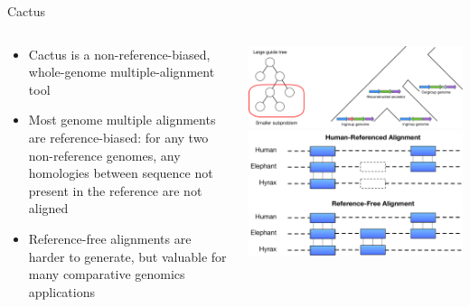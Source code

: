 \documentclass[10pt,
               hyperref={bookmarks=false,
                         bookmarksopen=false,
                         colorlinks=true,
                         linkcolor=blue,
                         urlcolor=blue},
               xcolor={svgnames,table}]{beamer}
\begin{document}
\begin{frame}{Cactus}
  \begin{columns}
    \begin{column}{0.5\textwidth}
      \begin{itemize}
          \item Cactus is a non-reference-biased, whole-genome multiple-alignment tool
          \item Most genome multiple alignments are reference-biased: for any two non-reference genomes, any homologies between sequence not present in the reference are not aligned
          \item Reference-free alignments are harder to generate, but valuable for many comparative genomics applications
      \end{itemize}
    \end{column}
    \begin{column}{0.5\textwidth}
      \includegraphics[width=\columnwidth]{images/progressive-alignment-and-reconstruction-minus-labels.pdf} \\
      \includegraphics[width=\columnwidth]{images/reference-free-diagram.pdf}
    \end{column}
  \end{columns}
\end{frame}
\end{document}
